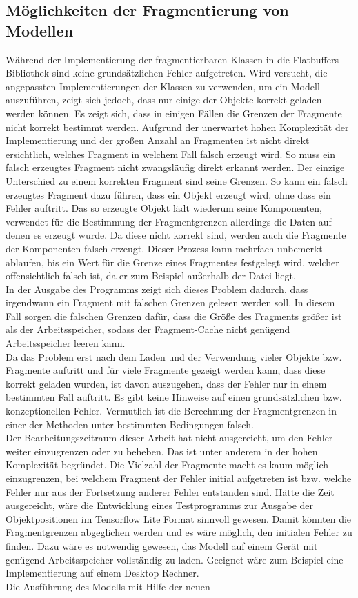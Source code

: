 \subsection{Möglichkeiten der Fragmentierung von Modellen}
    Während der Implementierung der fragmentierbaren Klassen in die Flatbuffers Bibliothek sind keine grundsätzlichen Fehler aufgetreten. Wird versucht, die angepassten Implementierungen der Klassen zu verwenden, um ein Modell auszuführen, zeigt sich jedoch, dass nur einige der Objekte korrekt geladen werden können. Es zeigt sich, dass in einigen Fällen die Grenzen der Fragmente nicht korrekt bestimmt werden. Aufgrund der unerwartet hohen Komplexität der Implementierung und der großen Anzahl an Fragmenten ist nicht direkt ersichtlich, welches Fragment in welchem Fall falsch erzeugt wird. So muss ein falsch erzeugtes Fragment nicht zwangsläufig direkt erkannt werden. Der einzige Unterschied zu einem korrekten Fragment sind seine Grenzen. So kann ein falsch erzeugtes Fragment dazu führen, dass ein Objekt erzeugt wird, ohne dass ein Fehler auftritt. Das so erzeugte Objekt lädt wiederum seine Komponenten, verwendet für die Bestimmung der Fragmentgrenzen allerdings die Daten auf denen es erzeugt wurde. Da diese nicht korrekt sind, werden auch die Fragmente der Komponenten falsch erzeugt. Dieser Prozess kann mehrfach unbemerkt ablaufen, bis ein Wert für die Grenze eines Fragmentes festgelegt wird, welcher offensichtlich falsch ist, da er zum Beispiel außerhalb der Datei liegt.\\ In der Ausgabe des Programms zeigt sich dieses Problem dadurch, dass irgendwann ein Fragment mit falschen Grenzen gelesen werden soll. In diesem Fall sorgen die falschen Grenzen dafür, dass die Größe des Fragments größer ist als der Arbeitsspeicher, sodass der Fragment-Cache nicht genügend Arbeitsspeicher leeren kann.\\ Da das Problem erst nach dem Laden und der Verwendung vieler Objekte bzw. Fragmente auftritt und für viele Fragmente gezeigt werden kann, dass diese korrekt geladen wurden, ist davon auszugehen, dass der Fehler nur in einem bestimmten Fall auftritt. Es gibt keine Hinweise auf einen grundsätzlichen bzw. konzeptionellen Fehler. Vermutlich ist die Berechnung der Fragmentgrenzen in einer der Methoden unter bestimmten Bedingungen falsch.\\ Der Bearbeitungszeitraum dieser Arbeit hat nicht ausgereicht, um den Fehler weiter einzugrenzen oder zu beheben. Das ist unter anderem in der hohen Komplexität begründet. Die Vielzahl der Fragmente macht es kaum möglich einzugrenzen, bei welchem Fragment der Fehler initial aufgetreten ist bzw. welche Fehler nur aus der Fortsetzung anderer Fehler entstanden sind. Hätte die Zeit ausgereicht, wäre die Entwicklung eines Testprogramms zur Ausgabe der Objektpositionen im Tensorflow Lite Format sinnvoll gewesen. Damit könnten die Fragmentgrenzen abgeglichen werden und es wäre möglich, den initialen Fehler zu finden. Dazu wäre es notwendig gewesen, das Modell auf einem Gerät mit genügend Arbeitsspeicher vollständig zu laden. Geeignet wäre zum Beispiel eine Implementierung auf einem Desktop Rechner.\\ Die Ausführung des Modells mit Hilfe der neuen 